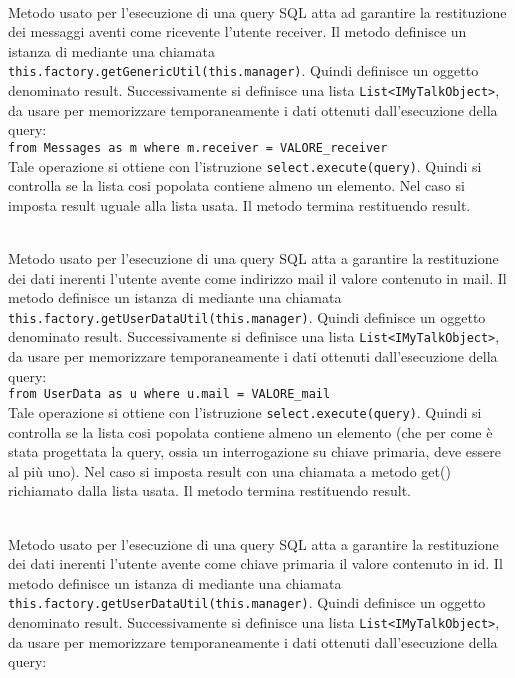 \begin{description}
		\item{}\\
	Metodo usato per l'esecuzione di una query SQL atta ad garantire la restituzione dei messaggi aventi come ricevente l'utente receiver. Il metodo definisce un istanza di  mediante una chiamata \verb|this.factory.getGenericUtil(this.manager)|. Quindi definisce un oggetto  denominato result. Successivamente si definisce una lista \texttt{List<IMyTalkObject>}, da usare per memorizzare temporaneamente i dati ottenuti dall'esecuzione della query:\\
	
	\verb|from Messages as m where m.receiver = VALORE_receiver|\\
	
	Tale operazione si ottiene con l'istruzione \verb|select.execute(query)|. Quindi si controlla se la lista cosi popolata contiene almeno un elemento. Nel caso si imposta result uguale alla lista usata. Il metodo termina restituendo result.	
	
	\item{}\\
	Metodo usato per l'esecuzione di una query SQL atta a garantire la restituzione dei dati inerenti l'utente avente come indirizzo mail il valore contenuto in mail. Il metodo definisce un istanza di  mediante una chiamata \verb|this.factory.getUserDataUtil(this.manager)|. Quindi definisce un oggetto  denominato result. Successivamente si definisce una lista \texttt{List<IMyTalkObject>}, da usare per memorizzare temporaneamente i dati ottenuti dall'esecuzione della query:\\
	
	\verb|from UserData as u where u.mail = VALORE_mail|\\
	
	Tale operazione si ottiene con l'istruzione \verb|select.execute(query)|. Quindi si controlla se la lista cosi popolata contiene almeno un elemento (che per come è stata progettata la query, ossia un interrogazione su chiave primaria, deve essere al più uno). Nel caso si imposta result con una chiamata a metodo get() richiamato dalla lista usata. Il metodo termina restituendo result.	
	
	\item{}\\
	Metodo usato per l'esecuzione di una query SQL atta a garantire la restituzione dei dati inerenti l'utente avente come chiave primaria il valore contenuto in id. Il metodo definisce un istanza di  mediante una chiamata \verb|this.factory.getUserDataUtil(this.manager)|. Quindi definisce un oggetto  denominato result. Successivamente si definisce una lista \texttt{List<IMyTalkObject>}, da usare per memorizzare temporaneamente i dati ottenuti dall'esecuzione della query:\\
	

\end{description}
